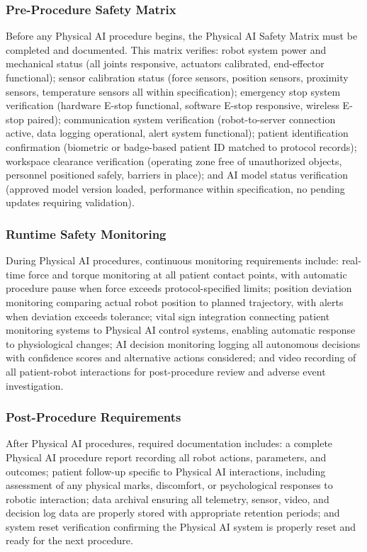 \subsubsection{Pre-Procedure Safety Matrix}

Before any Physical AI procedure begins, the Physical AI Safety Matrix must be
completed and documented. This matrix verifies: robot system power and
mechanical status (all joints responsive, actuators calibrated, end-effector
functional); sensor calibration status (force sensors, position sensors,
proximity sensors, temperature sensors all within specification); emergency stop
system verification (hardware E-stop functional, software E-stop responsive,
wireless E-stop paired); communication system verification (robot-to-server
connection active, data logging operational, alert system functional); patient
identification confirmation (biometric or badge-based patient ID matched to
protocol records); workspace clearance verification (operating zone free of
unauthorized objects, personnel positioned safely, barriers in place); and AI
model status verification (approved model version loaded, performance within
specification, no pending updates requiring validation).

\subsubsection{Runtime Safety Monitoring}

During Physical AI procedures, continuous monitoring requirements include:
real-time force and torque monitoring at all patient contact points, with
automatic procedure pause when force exceeds protocol-specified limits;
position deviation monitoring comparing actual robot position to planned
trajectory, with alerts when deviation exceeds tolerance; vital sign
integration connecting patient monitoring systems to Physical AI control
systems, enabling automatic response to physiological changes; AI decision
monitoring logging all autonomous decisions with confidence scores and
alternative actions considered; and video recording of all patient-robot
interactions for post-procedure review and adverse event investigation.

\subsubsection{Post-Procedure Requirements}

After Physical AI procedures, required documentation includes: a complete
Physical AI procedure report recording all robot actions, parameters, and
outcomes; patient follow-up specific to Physical AI interactions, including
assessment of any physical marks, discomfort, or psychological responses to
robotic interaction; data archival ensuring all telemetry, sensor, video, and
decision log data are properly stored with appropriate retention periods; and
system reset verification confirming the Physical AI system is properly reset
and ready for the next procedure.

